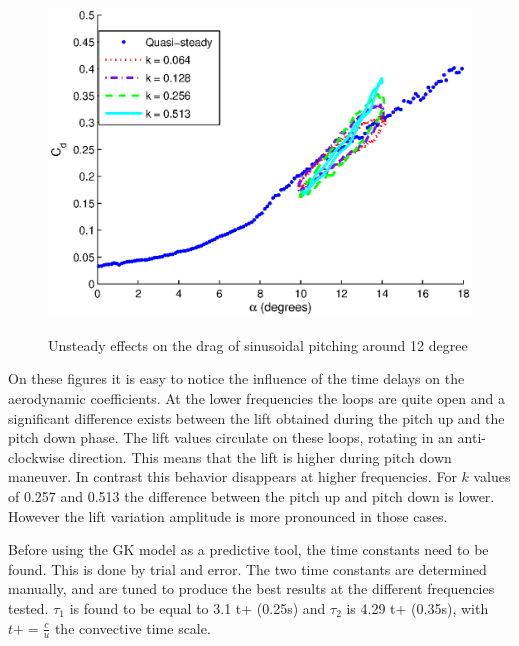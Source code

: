 \begin{figure}[h]
  \begin{center}
    \scalebox{0.9}  
    {\includegraphics{./Figures/Pitching_allcases_CD_12_amp_2.eps}}
  \end{center}
  \caption{Unsteady effects on the drag of sinusoidal pitching around 12 degree} 
  \label{fig:Pitching_allcases_Cd_12}
\end{figure}

\FloatBarrier

\par On these figures it is easy to notice the influence of the time delays on the aerodynamic coefficients.
At the lower frequencies the loops are quite open and a significant difference exists between the lift obtained during the pitch up and the pitch down phase.
The lift values circulate on these loops, rotating in an anti-clockwise direction.
This means that the lift is higher during pitch down maneuver.
In contrast this behavior disappears at higher frequencies.
For $k$ values of 0.257 and 0.513 the difference between the pitch up and pitch down is lower.
However the lift variation amplitude is more pronounced in those cases.

\par Before using the GK model as a predictive tool, the time constants need to be found.
This is done by trial and error.
The two time constants are determined manually, and are tuned to produce the best results at the different frequencies tested.
$\tau_1$ is found to be equal to 3.1 t+ (0.25s) and $\tau_2$ is 4.29 t+ (0.35s), with $t+=\frac{c}{u}$ the convective time scale.



